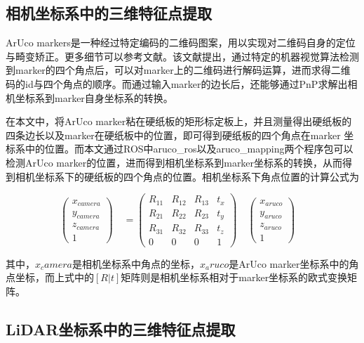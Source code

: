 
\subsection{相机坐标系中的三维特征点提取}

ArUco markers是一种经过特定编码的二维码图案，用以实现对二维码自身的定位与畸变矫正。更多细节可以参考文献。该文献提出，通过特定的机器视觉算法检测到marker的四个角点后，可以对marker上的二维码进行解码运算，进而求得二维码的id与四个角点的顺序。而通过输入marker的边长后，还能够通过PnP求解出相机坐标系到marker自身坐标系的转换。


在本文中，将ArUco marker粘在硬纸板的矩形标定板上，并且测量得出硬纸板的四条边长以及marker在硬纸板中的位置，即可得到硬纸板的四个角点在marker 坐标系中的位置。而本文通过ROS中aruco\_ros以及aruco\_mapping两个程序包可以检测ArUco marker的位置，进而得到相机坐标系到marker坐标系的转换，从而得到相机坐标系下的硬纸板的四个角点的位置。相机坐标系下角点位置的计算公式为

$$\begin{pmatrix} x_{camera}\\y_{camera}\\z_{camera}\\ 1 \end{pmatrix}\quad = \begin{pmatrix} R_{11}&R_{12}&R_{13}&t_x\\R_{21}&R_{22}&R_{23}&t_y\\R_{31}&R_{32}&R_{33}&t_z\\ 0&0&0&1 \end{pmatrix}\quad \begin{pmatrix} x_{aruco}\\y_{aruco}\\z_{aruco}\\ 1 \end{pmatrix}\quad$$
    
其中，$x_camera$是相机坐标系中角点的坐标，$x_aruco$是ArUco marker坐标系中的角点坐标，而上式中的$[R|t]$矩阵则是相机坐标系相对于marker坐标系的欧式变换矩阵。

\subsection{LiDAR坐标系中的三维特征点提取}

